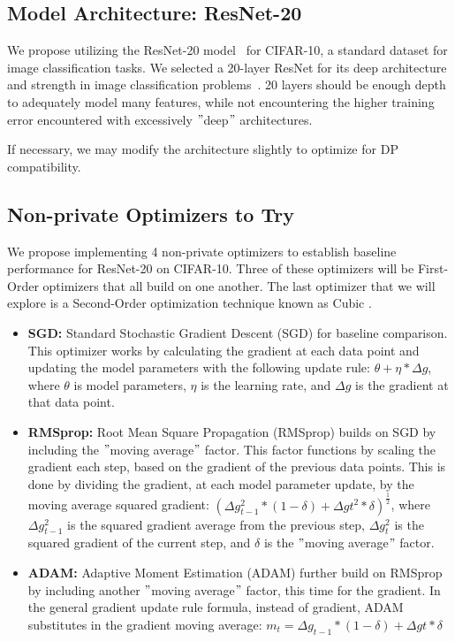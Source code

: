 \subsection{Model Architecture: ResNet-20}\label{subsec:model-architecture:-resnet-20}


We propose utilizing the ResNet-20 model~\cite{Idelbayev_ResNet20} for CIFAR-10,
a standard dataset for image classification tasks.
We selected a 20-layer ResNet for its deep architecture and strength in image classification problems~\cite{DBLP:journals/corr/HeZRS15}.
20
layers should be enough depth to adequately model many features, while not encountering the higher training error encountered
with excessively \("\)deep\("\) architectures. \cite{DBLP:journals/corr/HeZRS15}

If necessary, we may modify the architecture slightly to optimize for DP compatibility.

\subsection{Non-private Optimizers to Try}\label{subsec:non-private-optimizers-to-try}
We propose implementing 4 non-private optimizers to establish baseline performance for ResNet-20 on CIFAR-10.
Three of these optimizers will be First-Order optimizers
that all build on one another.
The last optimizer that we will explore is a Second-Order optimization technique known as Cubic .

\begin{itemize}
    \item \textbf{SGD:} Standard Stochastic Gradient Descent (SGD) for baseline comparison.
    This optimizer works by calculating the gradient at each data
    point and updating the model parameters with the following update rule: $\theta + \eta * \Delta g$, where $\theta$ is model parameters, $\eta$ is
    the learning rate, and $\Delta g$ is the gradient at that data point.
    \item \textbf{RMSprop:} Root Mean Square Propagation (RMSprop) builds on SGD by including the \("\)moving average\("\) factor.
    This factor functions by scaling the gradient
    each step, based on the gradient of the previous data points.
    This is done by dividing the gradient, at each model parameter update,
    by the moving average squared gradient: $(\Delta g_{t-1}^{2} * (1-\delta) + \Delta g{t}^{2}*\delta)^{\frac{1}{2}}$,
    where $\Delta g_{t-1}^{2}$ is the squared gradient average from the previous step, $\Delta g_{t}^{2}$ is
    the squared gradient of the current step, and $\delta$ is the \("\)moving average\("\) factor.  \cite{DBLP:journals/corr/abs-1807-06766,Jason_Huang_2020}
    \item \textbf{ADAM:} Adaptive Moment Estimation (ADAM) further build on RMSprop by including another \("\)moving average\("\) factor, this time for the gradient.
    In the general gradient update rule formula, instead of gradient,
    ADAM substitutes in the gradient moving average: $m_{t} = \Delta g_{t-1} * (1-\delta) + \Delta g{t}*\delta$~\cite{DBLP:journals/corr/abs-1807-06766}
\end{itemize}


